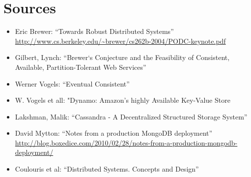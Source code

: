 \section{Sources}

\begin{itemize}
\item
  Eric Brewer: ``Towards Robust Distributed Systems''
  \url{http://www.cs.berkeley.edu/~brewer/cs262b-2004/PODC-keynote.pdf}
\item
  Gilbert, Lynch:
  ``Brewer‘s Conjecture and the Feasibility of Consistent, Available, Partition-Tolerant Web Services''
\item
  Werner Vogels: ``Eventual Consistent''
\item
  W. Vogels et all: "Dynamo: Amazon's highly Available Key-Value
  Store
\item
  Lakshman, Malik:
  ``Cassandra - A Decentralized Structured Storage System''
\item
  David Mytton: ``Notes from a production MongoDB deployment''
  \url{http://blog.boxedice.com/2010/02/28/notes-from-a-production-mongodb-deployment/}
\item
  Coulouris et al: ``Distributed Systems. Concepts and Design''
\end{itemize}

